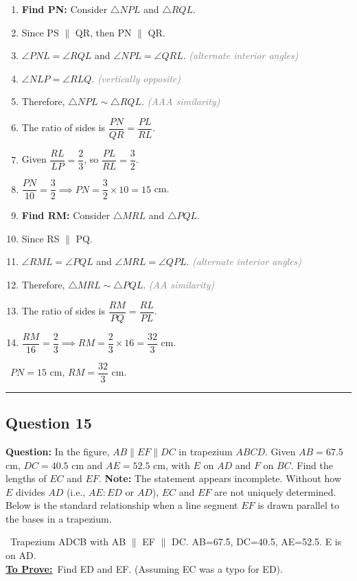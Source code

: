 \documentclass{article}
\newenvironment{steps}{%
  \begin{enumerate}[label=\textcolor{primary}{Step~\arabic*:}, leftmargin=*]
}{\end{enumerate}}
\newcommand{\sul}[1]{\uline{#1}}
\newcommand{\dul}[1]{\uuline{#1}}
\newcommand{\solutionheading}{{\raggedright\dul{\textbf{Solution}}\par}}
\newcommand{\given}[1]{\noindent\textbf{\textcolor{secondary}{\dul{Given:}}}~#1\\}
\newcommand{\toprove}[1]{\noindent\textbf{\textcolor{primary}{\sul{To Prove:}}}~#1\\}
\newcommand{\reason}[1]{\hfill\textit{\textcolor{gray}{(#1)}}}
\newcommand{\solutionrule}{\par\noindent\color{accent}\rule{\linewidth}{0.6pt}\par\smallskip}
\newcommand{\finalanswer}[1]{\noindent\textbf{\textcolor{accent}{\dul{Answer:}}}~#1\solutionrule}
\begin{document}
\begin{steps}
  \item \textbf{Find PN:} Consider $\triangle NPL$ and $\triangle RQL$.
  \item Since PS $\parallel$ QR, then PN $\parallel$ QR.
  \item $\angle PNL = \angle RQL$ and $\angle NPL = \angle QRL$. \reason{alternate interior angles}
  \item $\angle NLP = \angle RLQ$. \reason{vertically opposite}
  \item Therefore, $\triangle NPL \sim \triangle RQL$. \reason{AAA similarity}
  \item The ratio of sides is $\dfrac{PN}{QR} = \dfrac{PL}{RL}$.
  \item Given $\dfrac{RL}{LP} = \dfrac{2}{3}$, so $\dfrac{PL}{RL} = \dfrac{3}{2}$.
  \item $\dfrac{PN}{10} = \dfrac{3}{2} \implies PN = \dfrac{3}{2} \times 10 = 15$ cm.
  \item \textbf{Find RM:} Consider $\triangle MRL$ and $\triangle PQL$.
  \item Since RS $\parallel$ PQ.
  \item $\angle RML = \angle PQL$ and $\angle MRL = \angle QPL$. \reason{alternate interior angles}
  \item Therefore, $\triangle MRL \sim \triangle PQL$. \reason{AA similarity}
  \item The ratio of sides is $\dfrac{RM}{PQ} = \dfrac{RL}{PL}$.
  \item $\dfrac{RM}{16} = \dfrac{2}{3} \implies RM = \dfrac{2}{3} \times 16 = \dfrac{32}{3}$ cm.
\end{steps}

\finalanswer{$PN=15$ cm, $RM=\dfrac{32}{3}$ cm.}

\subsection*{Question 15}
\textbf{Question:} In the figure, $AB \parallel EF \parallel DC$ in trapezium $ABCD$. Given $AB = 67.5$ cm, $DC = 40.5$ cm and $AE = 52.5$ cm, with $E$ on $AD$ and $F$ on $BC$. Find the lengths of $EC$ and $EF$.
\textbf{Note:} The statement appears incomplete. Without how $E$ divides $AD$ (i.e., $AE:ED$ or $AD$), $EC$ and $EF$ are not uniquely determined. Below is the standard relationship when a line segment $EF$ is drawn parallel to the bases in a trapezium.

\solutionheading
\given{Trapezium ADCB with AB $\parallel$ EF $\parallel$ DC. AB=67.5, DC=40.5, AE=52.5. E is on AD.}
\toprove{Find ED and EF. (Assuming EC was a typo for ED).}
\end{document}
